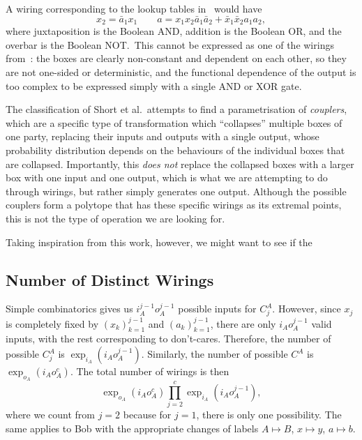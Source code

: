 \documentclass[10pt, a4paper]{article}
\newcommand{\?}{\mathrel{?}} %
\numberwithin{equation}{section} %
\theoremstyle{definition}
\theoremstyle{plain}
\theoremstyle{plain}
\begin{document}
    A wiring corresponding to the lookup tables in~ would have
    \begin{equation}
      x_2 = \bar{a}_1x_1 \qquad a = x_1x_2\bar{a}_1\bar{a}_2 + \bar{x}_1\bar{x}_2a_1a_2,
    \end{equation}
    where juxtaposition is the Boolean AND, addition is the Boolean OR, and the overbar is the Boolean NOT.\ This cannot be expressed as one of the wirings from~\cite{ShortEntangleSwap}: the boxes are clearly non-constant and dependent on each other, so they are not one-sided or deterministic, and the functional dependence of the output is too complex to be expressed simply with a single AND or XOR gate.

    The classification of Short et al.\ attempts to find a parametrisation of \emph{couplers}, which are a specific type of transformation which ``collapses'' multiple boxes of one party, replacing their inputs and outputs with a single output, whose probability distribution depends on the behaviours of the individual boxes that are collapsed. Importantly, this \emph{does not} replace the collapsed boxes with a larger box with one input and one output, which is what we are attempting to do through wirings, but rather simply generates one output. Although the possible couplers form a polytope that has these specific wirings as its extremal points, this is not the type of operation we are looking for.

    Taking inspiration from this work, however, we might want to see if the


    \subsection{Number of Distinct Wirings}

    Simple combinatorics gives us \(i_A^{j-1} o_A^{j-1}\) possible inputs for \(C_j^A\). However, since \(x_j\) is completely fixed by \({(x_k)}_{k=1}^{j-1}\) and \({(a_k)}_{k=1}^{j-1}\), there are only \(i_A o_A^{j-1}\) valid inputs, with the rest corresponding to don't-cares. Therefore, the number of possible \(C_j^A\) is \(\exp_{i_A}(i_A o_A^{j-1})\). Similarly, the number of possible \(C^A\) is \(\exp_{o_A}(i_A o_A^{c})\). The total number of wirings is then
    \begin{equation}
      \exp_{o_A}(i_A o_A^c) \prod_{j=2}^c \exp_{i_A}(i_A o_A^{j-1}),
    \end{equation}
    where we count from \(j = 2\) because for \(j = 1\), there is only one possibility. The same applies to Bob with the appropriate changes of labels \(A \mapsto B\), \(x \mapsto y\), \(a \mapsto b\). 
\end{document}
